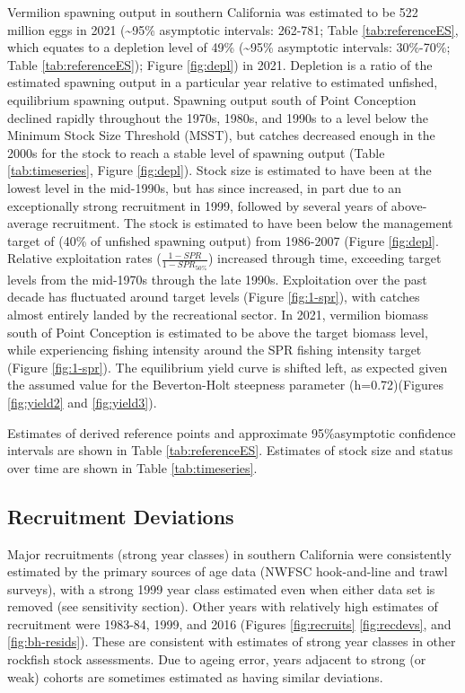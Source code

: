 \documentclass[
  english,
  a4paper,
]{article}
\begin{document}
Vermilion spawning output in southern California was estimated to be 522 million eggs in 2021 (\textasciitilde95\% asymptotic intervals: 262-781; Table \ref{tab:referenceES}, which equates to a depletion level of 49\% (\textasciitilde95\% asymptotic intervals: 30\%-70\%; Table \ref{tab:referenceES}); Figure \ref{fig:depl}) in 2021. Depletion is a ratio of the estimated spawning output in a particular year relative to estimated unfished, equilibrium spawning output. Spawning output south of Point Conception declined rapidly throughout the 1970s, 1980s, and 1990s to a level below the Minimum Stock Size Threshold (MSST), but catches decreased enough in the 2000s for the stock to reach a stable level of spawning output (Table \ref{tab:timeseries}, Figure \ref{fig:depl}). Stock size is estimated to have been at the lowest level in the mid-1990s, but has since increased, in part due to an exceptionally strong recruitment in 1999, followed by several years of above-average recruitment. The stock is estimated to have been below the management target of (40\% of unfished spawning output) from 1986-2007 (Figure \ref{fig:depl}. Relative exploitation rates (\(\frac{1-SPR}{1-SPR_{50\%}}\)) increased through time, exceeding target levels from the mid-1970s through the late 1990s. Exploitation over the past decade has fluctuated around target levels (Figure \ref{fig:1-spr}), with catches almost entirely landed by the recreational sector. In 2021, vermilion biomass south of Point Conception is estimated to be above the target biomass level, while experiencing fishing intensity around the SPR fishing intensity target (Figure \ref{fig:1-spr}). The equilibrium yield curve is shifted left, as expected given the assumed value for the Beverton-Holt steepness parameter (h=0.72)(Figures \ref{fig:yield2} and \ref{fig:yield3}).

Estimates of derived reference points and approximate 95\%asymptotic confidence intervals are shown in Table \ref{tab:referenceES}. Estimates of stock size and status over time are shown in Table \ref{tab:timeseries}.

\hypertarget{recruitment-deviations}{%
\subsection{Recruitment Deviations}\label{recruitment-deviations}}

Major recruitments (strong year classes) in southern California were consistently estimated by the primary sources of age data (NWFSC hook-and-line and trawl surveys), with a strong 1999 year class estimated even when either data set is removed (see sensitivity section). Other years with relatively high estimates of recruitment were 1983-84, 1999, and 2016 (Figures \ref{fig:recruits} \ref{fig:recdevs}, and \ref{fig:bh-resids}). These are consistent with estimates of strong year classes in other rockfish stock assessments. Due to ageing error, years adjacent to strong (or weak) cohorts are sometimes estimated as having similar deviations.
\end{document}
